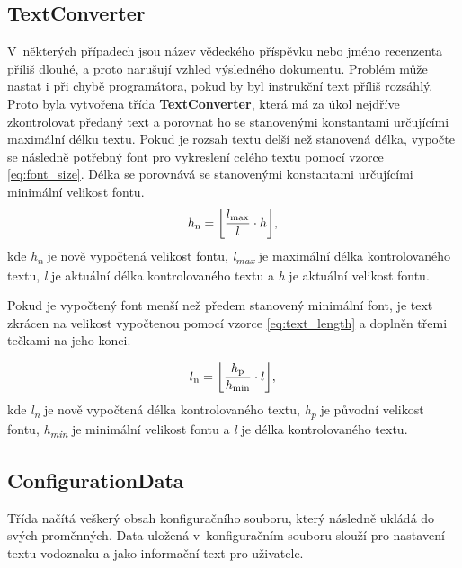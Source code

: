 \subsection{TextConverter}
V~některých případech jsou název vědeckého příspěvku nebo jméno recenzenta příliš dlouhé, a proto narušují vzhled výsledného dokumentu. Problém může nastat i při chybě programátora, pokud by byl instrukční text příliš rozsáhlý. Proto byla vytvořena třída \textbf{TextConverter}, která má za úkol nejdříve zkontrolovat předaný text a porovnat ho se stanovenými konstantami určujícími maximální délku textu. Pokud je rozsah textu delší než stanovená délka, vypočte se následně potřebný font pro vykreslení celého textu pomocí vzorce \eqref{eq:font_size}. Délka se porovnává se stanovenými konstantami určujícími minimální velikost fontu. 
\begin{equation}
h\textsubscript{n} = \floor*{\frac{l\textsubscript{max}}{l} \cdot h}, \\
\label{eq:font_size} 
\end{equation}
kde \textit{h\textsubscript{n}} je nově vypočtená velikost fontu, \textit{l\textsubscript{max}} je maximální délka kontrolovaného textu, \textit{l} je aktuální délka kontrolovaného textu a \textit{h} je aktuální velikost fontu.

Pokud je vypočtený font menší než předem stanovený minimální font, je text zkrácen na velikost vypočtenou pomocí vzorce  \eqref{eq:text_length} a doplněn třemi tečkami na jeho konci. 

\begin{equation}
l\textsubscript{n} = \floor*{\frac{h\textsubscript{p}}{h\textsubscript{min}} \cdot l}, \\
\label{eq:text_length}
\end{equation}
kde \textit{l\textsubscript{n}} je nově vypočtená délka kontrolovaného textu, \textit{h\textsubscript{p}} je původní velikost fontu, \textit{h\textsubscript{min}} je minimální velikost fontu a \textit{l} je délka kontrolovaného textu.
\subsection{ConfigurationData}
Třída načítá veškerý obsah konfiguračního souboru, který následně ukládá do svých proměnných. Data uložená v~konfiguračním souboru slouží pro nastavení textu vodoznaku a jako informační text pro uživatele.
